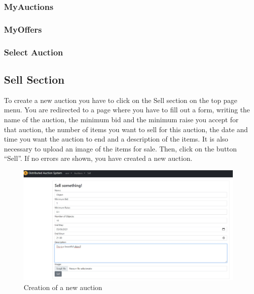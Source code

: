 
\subsubsection{MyAuctions}

\subsubsection{MyOffers}

\subsubsection{Select Auction}




\subsection{Sell Section}

To create a new auction you have to click on the Sell section on the top page
menu. You are redirected to a page where you have to fill out a form, writing
the name of the auction, the minimum bid and the minimum raise you accept for
that auction, the number of items you want to sell for this auction, the date
and time you want the auction to end and a description of the items. It is also
necessary to upload an image of the items for sale. Then, click on the button
``Sell''. If no errors are shown, you have created a new auction.

\begin{figure}[H]
	\includegraphics[width=\textwidth]{img/sell.jpg}
	\caption{Creation of a new auction}\label{fig:create_auction}
\end{figure}
